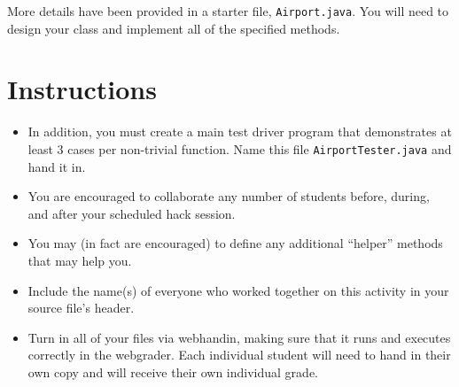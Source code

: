 \documentclass[12pt]{scrartcl}
\begin{document}
More details have been provided in a starter file, \texttt{Airport.java}.
You will need to design your class and implement all of the specified 
methods.

\section*{Instructions}

\begin{itemize}

  \item In addition, you must create a main test driver program that 
  demonstrates at least 3 cases per non-trivial function.  Name this file 
  \texttt{AirportTester.java} and hand it in.

  \item You are encouraged to collaborate any number of students 
  before, during, and after your scheduled hack session.  

  \item You may (in fact are encouraged) to define any additional
  ``helper'' methods that may help you.

  \item Include the name(s) of everyone who worked together on
  this activity in your source file's header.

  \item Turn in all of your files via webhandin, making sure that 
  it runs and executes correctly in the webgrader.  Each individual 
  student will need to hand in their own copy and will receive 
  their own individual grade.
\end{itemize}  
\end{document}
